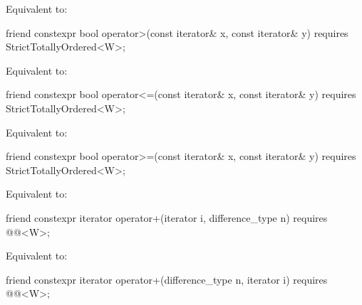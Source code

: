 \begin{itemdescr}
\pnum
\effects Equivalent to: 
\end{itemdescr}

\begin{itemdecl}
friend constexpr bool operator>(const iterator& x, const iterator& y)
  requires StrictTotallyOrdered<W>;
\end{itemdecl}

\begin{itemdescr}
\pnum
\effects Equivalent to: 
\end{itemdescr}

\begin{itemdecl}
friend constexpr bool operator<=(const iterator& x, const iterator& y)
  requires StrictTotallyOrdered<W>;
\end{itemdecl}

\begin{itemdescr}
\pnum
\effects Equivalent to: 
\end{itemdescr}

\begin{itemdecl}
friend constexpr bool operator>=(const iterator& x, const iterator& y)
  requires StrictTotallyOrdered<W>;
\end{itemdecl}

\begin{itemdescr}
\pnum
\effects Equivalent to: 
\end{itemdescr}

\begin{itemdecl}
friend constexpr iterator operator+(iterator i, difference_type n)
  requires @@<W>;
\end{itemdecl}

\begin{itemdescr}
\pnum
\effects Equivalent to: 
\end{itemdescr}

\begin{itemdecl}
friend constexpr iterator operator+(difference_type n, iterator i)
  requires @@<W>;
\end{itemdecl}

